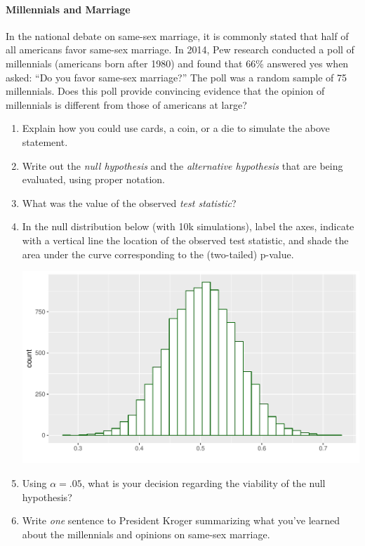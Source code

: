 \documentclass[10pt]{article}\usepackage[]{graphicx}\usepackage[]{color}
\makeatletter
\def\maxwidth{ %
  \ifdim\Gin@nat@width>\linewidth
    \linewidth
  \else
    \Gin@nat@width
  \fi
}
\newenvironment{knitrout}{}{} %
\makeatother
\begin{document}
\paragraph{Millennials and Marriage}
In the national debate on same-sex marriage, it is commonly stated that half of all americans favor same-sex marriage.  In 2014, Pew research conducted a poll of millennials (americans born after 1980) and found that 66\% answered yes when asked: ``Do you favor same-sex marriage?''  The poll was a random sample of 75 millennials.  Does this poll provide convincing evidence that the opinion of millennials is different from those of americans at large?

\begin{enumerate}
  \itemsep1in
  \item Explain how you could use cards, a coin, or a die to simulate the above statement.
  \item Write out the \emph{null hypothesis} and the \emph{alternative hypothesis} that are being evaluated, using proper notation.
  \item What was the value of the observed \emph{test statistic}?
  \item In the null distribution below (with 10k simulations), label the axes, indicate with a vertical line the location of the observed test statistic, and shade the area under the curve corresponding to the (two-tailed) p-value.
  
\begin{knitrout}
\color{fgcolor}
\includegraphics[width=\maxwidth]{figure/unnamed-chunk-1-1} 

\end{knitrout}

  \item Using $\alpha = .05$, what is your decision regarding the viability of the null hypothesis?
  \item Write \emph{one} sentence to President Kroger summarizing what you've learned about the millennials and opinions on same-sex marriage.  
  \ans
\end{enumerate}
\end{document}
